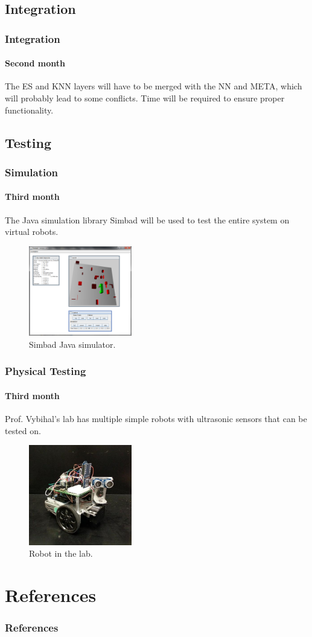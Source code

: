 \documentclass{beamer}
\begin{document}
	\subsection{Integration}
	
	\begin{frame}
		\frametitle{Integration}
		\framesubtitle{Second month}
		The ES and KNN layers will have to be merged with the NN and META, which will probably lead to some conflicts. Time will be required to ensure proper functionality.
	\end{frame}

	\subsection{Testing}
	
	\begin{frame}
		\frametitle{Simulation}
		\framesubtitle{Third month}
		The Java simulation library Simbad will be used to test the entire system on virtual robots.
		\begin{figure}
			\centering
			\includegraphics[width=0.4\textwidth]{figures/simbad.png}
			\caption
			{Simbad Java simulator. }
			\label{fig:simbad}
		\end{figure}
	\end{frame}

	\begin{frame}
		\frametitle{Physical Testing}
		\framesubtitle{Third month}
		Prof. Vybihal's lab has multiple simple robots with ultrasonic sensors that can be tested on.
		\begin{figure}
			\centering
			\includegraphics[width=0.4\textwidth]{figures/robot.jpg}
			\caption
			{Robot in the lab.}
			\label{fig:robot}
		\end{figure}
	\end{frame}
	
	\section{References}
	\begin{frame}[t,allowframebreaks]
		\frametitle{References}
		\printbibliography
	\end{frame}
	
\end{document}
